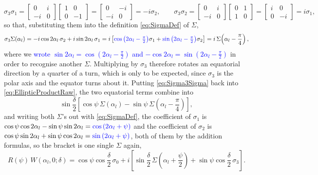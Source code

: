             \begin{equation*}
                \sigma_3\sigma_1 = \begin{bmatrix}0&i\\-i&0\end{bmatrix}\begin{bmatrix}1&0\\0&-1\end{bmatrix} = \begin{bmatrix}0&-i\\-i&0\end{bmatrix} = -i\sigma_2, \qquad
                \sigma_3\sigma_2 = \begin{bmatrix}0&i\\-i&0\end{bmatrix}\begin{bmatrix}0&1\\1&0\end{bmatrix} = \begin{bmatrix}i&0\\0&-i\end{bmatrix} = i\sigma_1,
            \end{equation*}
            so that, substituting them into the definition \ref{eq:SigmaDef} of $\Sigma$,
            \begin{equation}\label{eq:Sigma3Sigma}
                \sigma_3\Sigma(\alpha_l) = -i\cos2\alpha_l\,\sigma_2+i\sin2\alpha_l\,\sigma_1 = i\left[\textcolor{blue}{\cos\left(2\alpha_l-\tfrac{\pi}{2}\right)}\sigma_1+\textcolor{blue}{\sin\left(2\alpha_l-\tfrac{\pi}{2}\right)}\sigma_2\right] = i\,\Sigma\!\left(\alpha_l-\frac{\pi}{4}\right),
            \end{equation}
            where we \textcolor{blue}{wrote $\sin2\alpha_l=\cos\left(2\alpha_l-\frac\pi2\right)$ and $-\cos2\alpha_l=\sin\left(2\alpha_l-\frac\pi2\right)$} in order to recognise another $\Sigma$. Multiplying by $\sigma_3$ therefore rotates an equatorial direction by a quarter of a turn, which is only to be expected, since $\sigma_3$ is the polar axis and the equator turns about it. Putting \ref{eq:Sigma3Sigma} back into \ref{eq:EllipticProductRaw}, the two equatorial terms combine into
            \begin{equation*}
                \sin\frac{\delta}{2}\left[\cos\psi\,\Sigma(\alpha_l)-\sin\psi\,\Sigma\!\left(\alpha_l-\frac{\pi}{4}\right)\right],
            \end{equation*}
            and writing both $\Sigma$'s out with \ref{eq:SigmaDef}, the coefficient of $\sigma_1$ is $\cos\psi\cos2\alpha_l-\sin\psi\sin2\alpha_l=\textcolor{blue}{\cos\left(2\alpha_l+\psi\right)}$ and the coefficient of $\sigma_2$ is $\cos\psi\sin2\alpha_l+\sin\psi\cos2\alpha_l=\textcolor{blue}{\sin\left(2\alpha_l+\psi\right)}$, both of them by the addition formulas, so the bracket is one single $\Sigma$ again,
            \begin{equation}\label{eq:EllipticProduct}
                R(\psi)\,W\left(\alpha_l,0;\delta\right) = \cos\psi\cos\frac{\delta}{2}\,\sigma_0 + i\left[\sin\frac{\delta}{2}\,\Sigma\!\left(\alpha_l+\frac{\psi}{2}\right)+\sin\psi\cos\frac{\delta}{2}\,\sigma_3\right].
            \end{equation}

